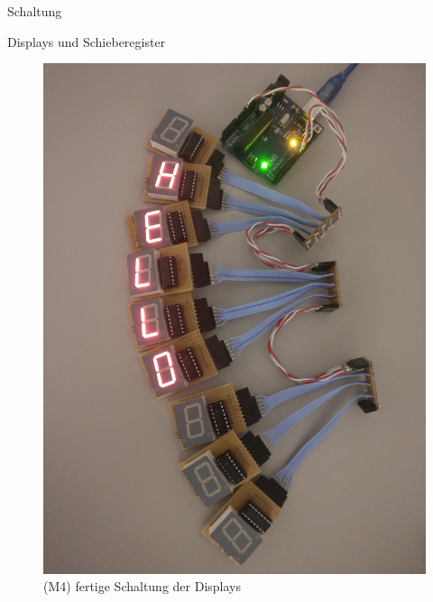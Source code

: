 \documentclass[mathserif,9pt]{article}
\begin{document}
    \begin{frame}{Schaltung}
        \begin{block}{Displays und Schieberegister}
               \begin{figure}
                    \centering
                    \includegraphics[height=0.5\paperheight]{img/all-segments-soldered.jpg}
                    \caption[M4]{(M4) fertige Schaltung der Displays}
                    \label{fig:bitshift_all}
               \end{figure}
        \end{block}
    \end{frame}
    
\end{document}
